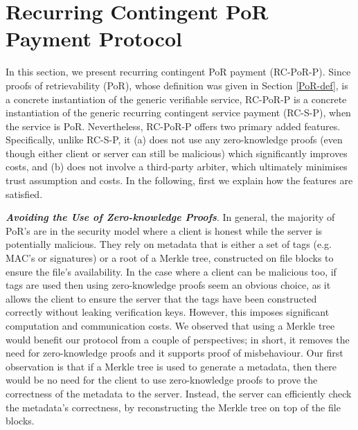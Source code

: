 


\section{Recurring Contingent PoR Payment Protocol}
In this section, we present recurring contingent PoR payment (RC-PoR-P). Since proofs of  retrievability (PoR), whose definition was given in Section \ref{PoR-def}, is a concrete instantiation of the generic verifiable service, RC-PoR-P is a concrete instantiation of the generic recurring contingent service payment (RC-S-P), when the service is PoR. Nevertheless, RC-PoR-P offers  two primary added features. Specifically, unlike RC-S-P, it (a) does not use any zero-knowledge proofs (even though either client or server can still be  malicious) which significantly improves  costs, and (b)  does not involve a third-party arbiter, which ultimately minimises trust assumption and costs.  In the following, first we  explain how the features are satisfied.


\noindent\textit{\textbf{Avoiding the Use of Zero-knowledge Proofs}}. In general, the majority of  PoR's are in the security model where a client is honest while the server is potentially malicious. They rely on metadata that is either a set of tags (e.g. MAC's or signatures) or a root of a Merkle tree,  constructed on  file blocks to ensure the file's availability. In the case where a client can  be malicious too,  if tags are used then using zero-knowledge proofs seem  an obvious choice, as it allows the client to ensure the server that the tags have been constructed correctly without leaking verification keys. However, this imposes significant computation and communication costs. We observed that using a Merkle tree would benefit our protocol from a couple of perspectives; in short, it removes the need for zero-knowledge proofs and it supports proof of misbehaviour. Our first observation is that if a Merkle tree is used to generate a metadata, then   there would be no need for the client to use zero-knowledge proofs to prove the correctness of the metadata to the server. Instead, the server can efficiently check the metadata's correctness, by reconstructing the Merkle tree on top of the file blocks. 


